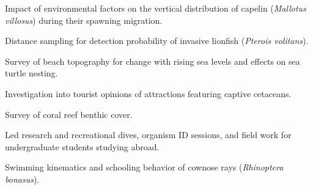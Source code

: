 \documentclass[a4paper]{deedy-resume} %
\begin{document}

Impact of environmental factors on the vertical distribution of capelin (\textit{Mallotus villosus}) during their spawning migration.

\sectionspace %



\begin{tightitemize}
\item Distance sampling for detection probability of invasive lionfish (\textit{Pterois volitans}).
\item Survey of beach topography for change with rising sea levels and effects on sea turtle nesting.
\item Investigation into tourist opinions of attractions featuring captive cetaceans.
\item Survey of coral reef benthic cover.
\item Led research and recreational dives, organism ID sessions, and field work for undergraduate students studying abroad.
\end{tightitemize}

\sectionspace %



Swimming kinematics and schooling behavior of cownose rays (\textit{Rhinoptera bonasus}).

\sectionspace %


\end{document}
